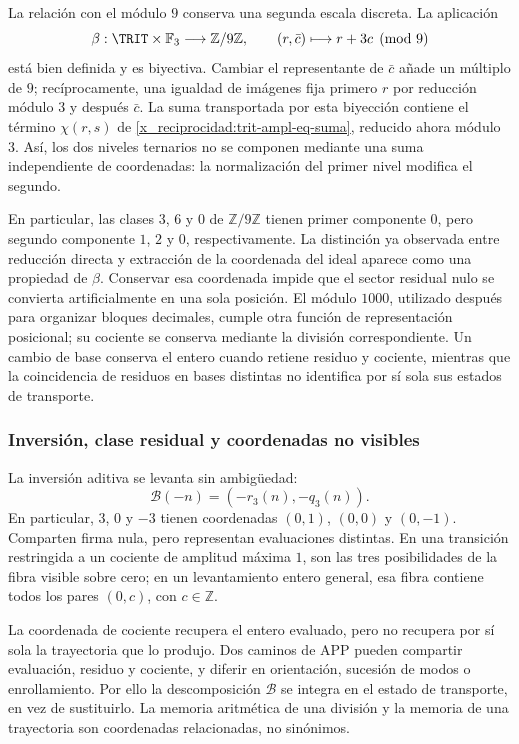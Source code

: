 La relación con el módulo \(9\) conserva una segunda escala discreta.
La aplicación
\[
 \beta:\TRIT\times\mathbb F_3\longrightarrow\mathbb Z/9\mathbb Z,
 \qquad (r,\bar c)\longmapsto r+3c\pmod9
\]
está bien definida y es biyectiva. Cambiar el representante de \(\bar c\)
añade un múltiplo de \(9\); recíprocamente, una igualdad de imágenes fija
primero \(r\) por reducción módulo \(3\) y después \(\bar c\). La suma
transportada por esta biyección contiene el término
\(\chi(r,s)\) de \eqref{x_reciprocidad:trit-ampl-eq-suma}, reducido ahora módulo \(3\).
Así, los dos niveles ternarios no se componen mediante una suma
independiente de coordenadas: la normalización del primer nivel modifica
el segundo.

En particular, las clases \(3\), \(6\) y \(0\) de
\(\mathbb Z/9\mathbb Z\) tienen primer componente \(0\), pero segundo
componente \(1\), \(2\) y \(0\), respectivamente. La distinción ya observada
entre reducción directa y extracción de la coordenada del ideal aparece
como una propiedad de \(\beta\). Conservar esa coordenada impide que el
sector residual nulo se convierta artificialmente en una sola posición.
El módulo \(1000\), utilizado después para organizar bloques decimales,
cumple otra función de representación posicional; su cociente se conserva
mediante la división correspondiente. Un cambio de base conserva el entero
cuando retiene residuo y cociente, mientras que la coincidencia de residuos
en bases distintas no identifica por sí sola sus estados de transporte.

\subsubsection{Inversión, clase residual y coordenadas no visibles}
\label{x_reciprocidad:trit-ampl-inversion}

La inversión aditiva se levanta sin ambigüedad:
\[
 \mathcal B(-n)=(-r_3(n),-q_3(n)).
\]
En particular, \(3\), \(0\) y \(-3\) tienen coordenadas
\((0,1)\), \((0,0)\) y \((0,-1)\). Comparten firma nula, pero representan
evaluaciones distintas. En una transición restringida a un cociente de
amplitud máxima \(1\), son las tres posibilidades de la fibra visible sobre
cero; en un levantamiento entero general, esa fibra contiene todos los pares
\((0,c)\), con \(c\in\mathbb Z\).

La coordenada de cociente recupera el entero evaluado, pero no recupera por
sí sola la trayectoria que lo produjo. Dos caminos de APP pueden compartir
evaluación, residuo y cociente, y diferir en orientación, sucesión de modos o
enrollamiento. Por ello la descomposición \(\mathcal B\) se integra en el
estado de transporte, en vez de sustituirlo. La memoria aritmética de una
división y la memoria de una trayectoria son coordenadas relacionadas, no
sinónimos.

